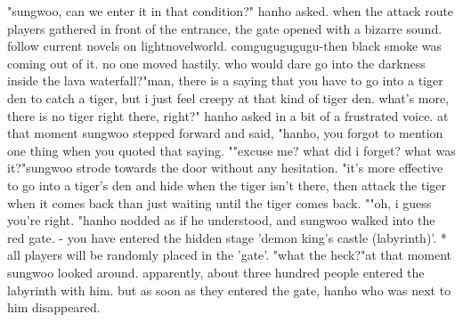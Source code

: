 "sungwoo, can we enter it in that condition?" hanho asked.
when the attack route players gathered in front of the entrance, the gate opened with a bizarre sound.
follow current novels on lightnov­elworld.
c‌omgugugugugu-then black smoke was coming out of it.
 no one moved hastily.
who would dare go into the darkness inside the lava waterfall?"man, there is a saying that you have to go into a tiger den to catch a tiger, but i just feel creepy at that kind of tiger den.
 what's more, there is no tiger right there, right?" hanho asked in a bit of a frustrated voice.
 at that moment sungwoo stepped forward and said, "hanho, you forgot to mention one thing when you quoted that saying.
""excuse me? what did i forget? what was it?"sungwoo strode towards the door without any hesitation.
 "it's more effective to go into a tiger's den and hide when the tiger isn't there, then attack the tiger when it comes back than just waiting until the tiger comes back.
""oh, i guess you're right.
"hanho nodded as if he understood, and sungwoo walked into the red gate.
- you have entered the hidden stage 'demon king's castle (labyrinth)'.
* all players will be randomly placed in the 'gate'.
"what the heck?"at that moment sungwoo looked around.
 apparently, about three hundred people entered the labyrinth with him.
 but as soon as they entered the gate, hanho who was next to him disappeared.

